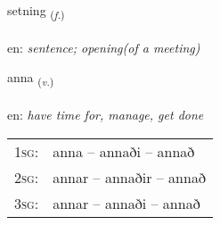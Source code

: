 \documentclass[frontgrid, backgrid]{flacards}\usepackage[]{graphicx}\usepackage[]{color}
\begin{document}
\renewcommand{\flhead}{\vskip5pt \fboxsep=0pt {\small\bfseries\footnotesize Nafnorð | Noun}}
\renewcommand{\fcfoot}{\vskip5pt \fboxsep=0pt \hspace{2pt}{\small\bfseries\footnotesize 2K}}

\renewcommand{\blhead}{\vskip5pt {\small\bfseries\footnotesize Nafnorð | Noun }}
\renewcommand{\bcfoot}{\vskip5pt \hspace{2pt}{\small\bfseries\footnotesize 2K}}


{setning \small{\textsubscript{(\textit{f.})}} \\[1ex] %
\textphonetic{[sɛhtniŋk]} \\
en: \emph{sentence; opening(of a meeting)} \\  [2ex]
\renewcommand*{\arraystretch}{0.8}
}

\renewcommand{\flhead}{\vskip5pt \fboxsep=0pt {\small\bfseries\footnotesize Sagnorð | Verb}}
\renewcommand{\fcfoot}{\vskip5pt \fboxsep=0pt \hspace{2pt}{\small\bfseries\footnotesize 2K}}

\renewcommand{\blhead}{\vskip5pt {\small\bfseries\footnotesize Sagnorð | Verb }}
\renewcommand{\bcfoot}{\vskip5pt \hspace{2pt}{\small\bfseries\footnotesize 2K}}


{anna \small{\textsubscript{(\textit{v.})}} \\[1ex] %
\textphonetic{[ana]} \\
en: \emph{have time for, manage, get done} \\  [2ex]
\renewcommand*{\arraystretch}{0.8}
\begin{tabular}{p{1cm}l}
\textsc{1sg}: & anna -- annaði -- annað \\ 
\textsc{2sg}: & annar -- annaðir -- annað \\ 
\textsc{3sg}: & annar -- annaði -- annað \\ 
\end{tabular}
}
\end{document}
